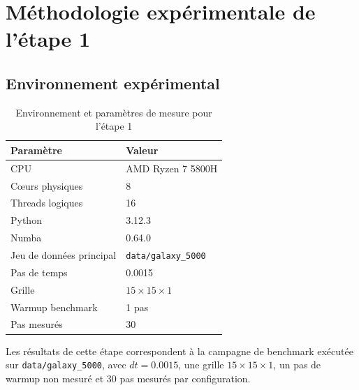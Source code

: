 \section{Méthodologie expérimentale de l'étape 1}

\subsection{Environnement expérimental}

\begin{table}[H]
    \centering
    \begin{tabular}{l l}
        \toprule
        \textbf{Paramètre} & \textbf{Valeur} \\
        \midrule
        CPU & AMD Ryzen 7 5800H \\
        Cœurs physiques & 8 \\
        Threads logiques & 16 \\
        Python & 3.12.3 \\
        Numba & 0.64.0 \\
        Jeu de données principal & \texttt{data/galaxy\_5000} \\
        Pas de temps & 0.0015 \\
        Grille & \(15 \times 15 \times 1\) \\
        Warmup benchmark & 1 pas \\
        Pas mesurés & 30 \\
        \bottomrule
    \end{tabular}
    \caption{Environnement et paramètres de mesure pour l'étape 1}
    \label{tab:environment_stage1}
\end{table}

Les résultats de cette étape correspondent à la campagne de benchmark exécutée sur \texttt{data/galaxy\_5000}, avec \(dt = 0.0015\), une grille \(15 \times 15 \times 1\), un pas de warmup non mesuré et 30 pas mesurés par configuration.
